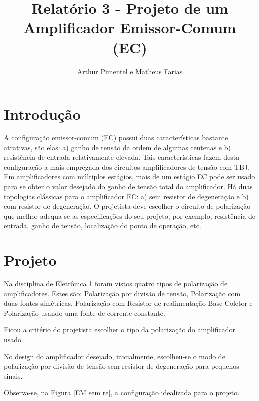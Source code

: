 \documentclass[journal, a4paper]{IEEEtran}
\begin{document}
	\title{Relatório 3 - Projeto de um Amplificador Emissor-Comum (EC)}
	\author{Arthur Pimentel e Matheus Farias

    }
	\maketitle
	\vspace{}
\section{Introdução}

    \tab A configuração emissor-comum (EC) possui duas características bastante atrativas, são elas: a) ganho de tensão da ordem de algumas centenas e b) resistência de entrada relativamente elevada. Tais características fazem desta configuração a mais empregada dos circuitos amplificadores de tensão com TBJ. Em amplificadores com múltiplos estágios, mais de um estágio EC pode ser usado para se obter o valor desejado do ganho de tensão total do amplificador. Há duas topologias clássicas para o amplificador EC: a) sem resistor de degeneração e b) com resistor de degeneração. O projetista deve escolher o circuito de polarização que melhor adequa-se as especificações do seu projeto, por exemplo, resistência de entrada, ganho de tensão, localização do ponto de operação, etc.

\section{Projeto}
	
    \tab Na disciplina de Eletrônica 1 foram vistos quatro tipos de polarização de amplificadores. Estes são: Polarização por divisão de tensão, Polarização com duas fontes simétricas, Polarização com Resistor de realimentação Base-Coletor e Polarização usando uma fonte de corrente constante.
    
    \tab Ficou a critério do projetista escolher o tipo da polarização do amplificador usado.
    
    \tab No design do amplificador desejado, inicialmente, escolheu-se o modo de polarização por divisão de tensão sem resistor de degeneração para pequenos sinais.  
    
    \tab Observa-se, na Figura \ref{EM sem re}, a configuração idealizada para o projeto.
    
    
    
    
\end{document}
